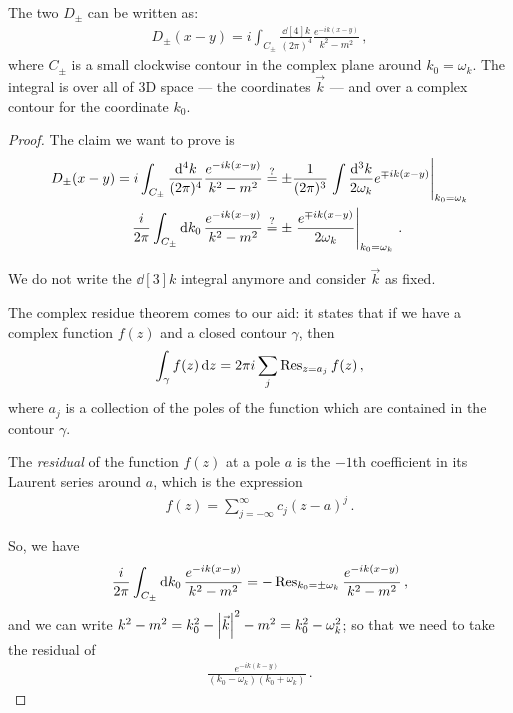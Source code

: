 \documentclass[main.tex]{subfiles}
\begin{document}
\begin{claim}
The two \(D_{\pm } \) can be written as: 
%
\begin{align} \label{eq:scalar-field-propagator}
    D_{\pm } (x-y) = i \int_{C_{\pm}} \frac{ \dd[4]{k}}{(2 \pi )^{4}} \frac{e^{-ik(x-y)}}{k^2- m^2}
    \,,
\end{align}
%
where \(C_{\pm}\) is a small clockwise contour in the complex plane around \(k_0 = \omega_{k}\). The integral is over all of 3D space --- the coordinates \(\vec{k}\) --- and over a complex contour for the coordinate \(k_0 \). 
\end{claim}

\begin{proof}
The claim we want to prove is 
%
\begin{subequations}
\begin{align}
D_{\pm} (x-y) 
= i \int_{C_{\pm}} \frac{ \dd[4]{k}}{(2\pi )^{4}}
\frac{e^{-ik(x-y)}}{k^2 - m^2}
&\overset{?}{=}
\pm \frac{1}{(2 \pi)^3} \eval{\int \frac{ \dd[3]{k}}{2 \omega_{k}} e^{\mp ik (x-y)}}_{k_0 = \omega_{k}}  \\
\frac{i}{2 \pi }
\int_{C_{\pm}} \dd{k_0 } \frac{e^{-ik(x-y)}}{k^2-m^2}
&\overset{?}{=}
\pm \eval{\frac{e^{\mp ik(x-y)}}{2 \omega_{k}}}_{k_0 = \omega_{k}}
\,.
\end{align}
\end{subequations}

We do not write the \(\dd[3]{k}\) integral anymore and consider \(\vec{k}\) as fixed. 

The complex residue theorem comes to our aid: it states that if we have a complex function \(f(z)\) and a closed contour \(\gamma \), then 
%
\begin{align}
\int_{\gamma } f(z) \dd{z} = 2 \pi i \sum _{j} \Res_{z = a_j} f(z)
\,,
\end{align}
%
where \(a_j\) is a collection of the poles of the function which are contained in the contour \(\gamma \). 

The \emph{residual} of the function \(f(z)\) at a pole \(a\) is the \(-1\)th coefficient in its Laurent series around \(a\), which is the expression 
%
\begin{align}
f(z) = \sum _{j= - \infty }^{ \infty } c_j (z-a)^{j}
\,.
\end{align}

So, we have 
%
\begin{align}
\frac{i}{2 \pi } 
\int_{C_{\pm}} \dd{k_0} 
\frac{e^{-ik(x-y)}}{k^2-m^2} 
= - \Res_{k_0 = \pm \omega_{k}} 
\frac{e^{-ik(x-y)}}{k^2-m^2} 
\,,
\end{align}
%
and we can write \(k^2 - m^2 = k_0^2 - \abs{\vec{k}}^2 - m^2 = k_0^2 - \omega_{k}^2\); so that we need to take the residual of 
%
\begin{align}
\frac{e^{-ik(k-y)}}{(k_0 - \omega_{k}) (k_0 + \omega_{k})}
\,.
\end{align}


\end{proof}
\end{document}
